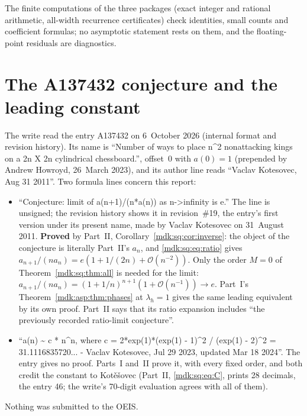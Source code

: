 \documentclass[11pt,letterpaper]{article}
\numberwithin{equation}{section}
\theoremstyle{remark}\newtheorem{remark}[theorem]{Remark}
\newcommand{\Oh}{\mathcal O}\newcommand{\Q}{\mathbb Q}\newcommand{\N}{\mathbb N}\newcommand{\R}{\mathbb R}
\begin{document}
The finite computations of the three packages (exact integer and rational arithmetic, all-width recurrence certificates) check identities, small counts and coefficient formulas; no asymptotic statement rests on them, and the floating-point residuals are diagnostics.

\section*{The A137432 conjecture and the leading constant}\label{mdk:sec:oeisconj}
The write read the entry A137432 \cite{oeisA137432} on 6~October 2026 (internal format and revision history). Its name is ``Number of ways to place n\textasciicircum2 nonattacking kings on a 2n X 2n cylindrical chessboard.'', offset~0 with $a(0)=1$ (prepended by Andrew Howroyd, 26~March 2023), and its author line reads ``Vaclav Kotesovec, Aug 31 2011''. Two formula lines concern this report:
\begin{itemize}
\item ``Conjecture: limit of a(n+1)/(n*a(n)) as n->infinity is e.'' The line is unsigned; the revision history shows it in revision~\#19, the entry's first version under its present name, made by Vaclav Kotesovec on 31~August 2011. \textbf{Proved} by Part~II, Corollary~\ref{mdk:sq:cor:inverse}: the object of the conjecture is literally Part~II's $a_n$, and \eqref{mdk:sq:eq:ratio} gives $a_{n+1}/(na_n)=e(1+1/(2n)+\Oh(n^{-2}))$. Only the order $M=0$ of Theorem~\ref{mdk:sq:thm:all} is needed for the limit: $a_{n+1}/(na_n)=(1+1/n)^{n+1}(1+\Oh(n^{-1}))\to e$. Part~I's Theorem~\ref{mdk:asp:thm:phases} at $\lambda_h=1$ gives the same leading equivalent by its own proof. Part~II says that its ratio expansion includes ``the previously recorded ratio-limit conjecture''.
\item ``a(n) \textasciitilde{} c * n\textasciicircum n, where c = 2*exp(1)*(exp(1) - 1)\textasciicircum2 / (exp(1) - 2)\textasciicircum2 = 31.1116835720... - Vaclav Kotesovec, Jul 29 2023, updated Mar 18 2024''. The entry gives no proof. Parts~I and~II prove it, with every fixed order, and both credit the constant to Kot\v e\v sovec (Part~II, \eqref{mdk:sq:eq:C}, prints 28 decimals, the entry 46; the write's 70-digit evaluation agrees with all of them).
\end{itemize}
Nothing was submitted to the OEIS.
\end{document}
